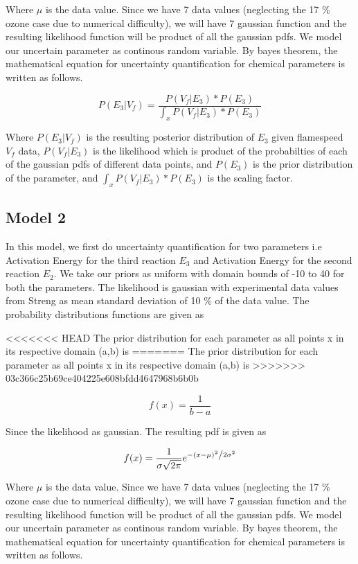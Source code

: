   
\noindent Where $\mu$ is the data value. Since we have 7 data values (neglecting the 17 \% ozone case due to numerical difficulty), we will have 7 gaussian function and the resulting likelihood function will be product of all the gaussian pdfs. We model our uncertain parameter as continous random variable. By bayes theorem, the mathematical equation for uncertainty quantification for chemical parameters is written as follows. 

 $$P( E_3 |V_f ) = \frac{P(V_f| E_3)*  P(E_3)}{\int_x P(V_f| E_3)* P(E_3)}$$ 
 
 \noindent Where  $P( E_3 |V_f ) $ is the resulting posterior distribution of $E_3$ given flamespeed $V_f$ data, $P(V_f| E_3)$ is the likelihood which is product of the probabilties of each of the gaussian pdfs of different data points, and $ P(E_3)$ is the prior distribution of the parameter, and $\int_x P(V_f|E_3)*P(E_3)$ is the scaling factor.
 

\subsection{Model 2}


\noindent In this model, we first do uncertainty quantification for two parameters i.e Activation Energy for the third reaction $E_3$ and Activation Energy for the second reaction $E_2$. We take our priors as uniform with domain bounds of -10 to 40 for both the parameters. The likelihood is gaussian with experimental data values from Streng\cite{Streng} as mean standard deviation of 10 \% of the data value. The probability distributions functions are given as

<<<<<<< HEAD
\noindent The prior distribution for each parameter as all points x in its respective domain (a,b) is 
=======
\noindent The prior distribution for each parameter as all points x in its respective domain (a,b) is 
>>>>>>> 03c366c25b69ce404225e608bfdd4647968b6b0b

$$f(x) = \frac{1}{b -a}$$


\noindent Since the likelihood as gaussian. The resulting pdf is given as 

$$f(x) = \frac{1}{{\sigma \sqrt {2\pi } }}e^{{{ - \left( {x - \mu } \right)^2 } \mathord{\left/ {\vphantom {{ - \left( {x - \mu } \right)^2 } {2\sigma ^2 }}} \right. \kern-\nulldelimiterspace} {2\sigma ^2 }}} $$

  
\noindent Where $\mu$ is the data value. Since we have 7 data values (neglecting the 17 \% ozone case due to numerical difficulty), we will have 7 gaussian function and the resulting likelihood function will be product of all the gaussian pdfs. We model our uncertain parameter as continous random variable. By bayes theorem, the mathematical equation for uncertainty quantification for chemical parameters is written as follows. 

